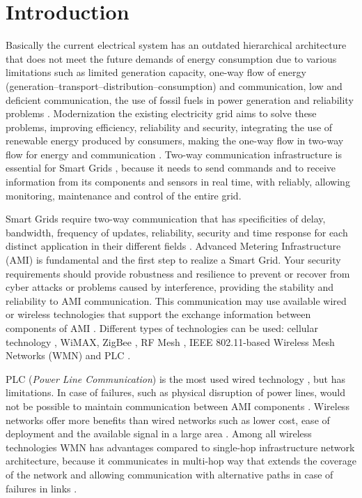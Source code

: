 \documentclass[conference]{IEEEtran}
\begin{document}
\section{Introduction}
Basically the current electrical system has an outdated hierarchical architecture that does not meet the future demands of energy consumption due to various limitations such as limited generation capacity, one-way flow of energy (generation–transport–distribution–consumption) and communication,  low and deficient communication, the use of fossil fuels in power generation and reliability problems \cite{Farhangi2010}. 
Modernization the existing electricity grid aims to solve these problems, improving efficiency, reliability and security, integrating the use of renewable energy produced by consumers, making the one-way flow in two-way flow for energy and communication \cite {Farhangi2010,Moslehi2010}. Two-way communication infrastructure is essential for Smart Grids \cite{Gungor2011}, because it needs to send commands and to receive information from its components and sensors  in real time, with reliably, allowing monitoring, maintenance and control of the entire grid. 

Smart Grids require two-way communication that has specificities of delay, bandwidth, frequency of updates, reliability, security and time response for each distinct application in their different fields \cite{Gungor2011}. Advanced Metering Infrastructure (AMI) is fundamental and the first step to realize a Smart Grid\cite{4781067,5484223}. Your security requirements should provide robustness and resilience to prevent or recover from cyber attacks or problems caused by interference, providing the stability and reliability to AMI communication. This communication may use available wired or wireless technologies that support the exchange information between components of AMI \cite{Saputro2012,4547164}. Different types of technologies can be used: cellular technology \cite{5589988}, WiMAX, ZigBee \cite{5589988}, RF Mesh \cite{5622071}, IEEE 802.11-based Wireless Mesh Networks (WMN) and PLC \cite{5479945}. 

PLC (\emph{Power Line Communication}) is the most used wired technology \cite{Saputro2012}, but has limitations. In case of failures, such as physical disruption of power lines, would not be possible to maintain communication between AMI components \cite{Gungor2006}. Wireless networks offer more benefits than wired networks such as lower cost, ease of deployment and the available signal in a large area \cite{5589988}. Among all wireless technologies WMN has advantages compared to single-hop infrastructure network architecture, because it communicates in multi-hop way that extends the coverage of the network and allowing communication with alternative paths in case of failures in links \cite{5622071,Fang2012}. 
\end{document}
